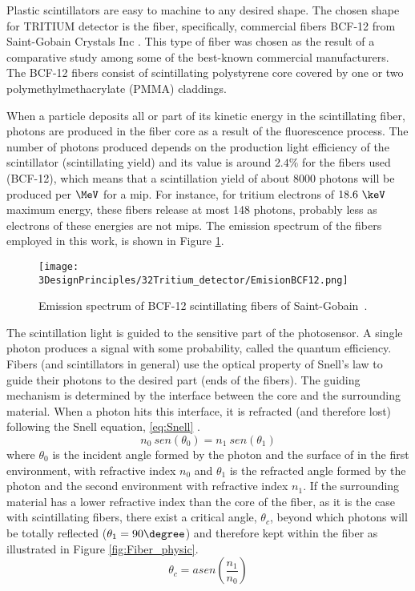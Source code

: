 Plastic scintillators are easy to machine to any desired shape. The chosen shape for TRITIUM detector is the fiber, specifically, commercial fibers BCF-12 from Saint-Gobain Crystals Inc \cite{DataSheetBCF12Fiber}. This type of fiber was chosen as the result of a comparative study \cite{TFGAlberto} among some of the best-known commercial manufacturers. The BCF-12 fibers consist of scintillating polystyrene core covered by one or two polymethylmethacrylate (PMMA) claddings. %

When a particle deposits all or part of its kinetic energy in the scintillating fiber, photons are produced in the fiber core as a result of the fluorescence process. The number of photons produced depends on the production light efficiency of the scintillator (scintillating yield) and its value is around $2.4\%$ for the fibers used (BCF-12), which means that a scintillation yield of about $8000$ photons will be produced per $\MeV$ for a mip. For instance, for tritium electrons of $18.6~\keV$ maximum energy, these fibers release at most 148 photons, probably less as electrons of these energies are not mips. The emission spectrum of the fibers employed in this work, is shown in Figure \ref{fig:EmissionSpectrumFibers}.

\begin{figure}[htbp]
\centering
\texttt{[image: 3DesignPrinciples/32Tritium\_detector/EmisionBCF12.png]}
\caption{Emission spectrum of BCF-12 scintillating fibers of Saint-Gobain\label{fig:EmissionSpectrumFibers}~\cite{DataSheetBCF12Fiber}.}
\end{figure}

The scintillation light is guided to the sensitive part of the photosensor. A single photon produces a signal with some probability, called the quantum efficiency. Fibers (and scintillators in general) use the optical property of Snell's law \cite{Snell} to guide their photons to the desired part (ends of the fibers). The guiding mechanism is determined by the interface between the core and the surrounding material. When a photon hits this interface, it is refracted (and therefore lost) following the Snell equation, \ref{eq:Snell} \cite{Snell}. 
\begin{equation}
n_0~sen(\theta_0) = n_1~sen(\theta_1)
\label{eq:Snell}
\end{equation}
where $\theta_0$ is the incident angle formed by the photon and the surface of in the first environment, with refractive index $n_0$ and $\theta_1$  is the refracted angle formed by the photon and the second environment with refractive index $n_1$. If the surrounding material has a lower refractive index than the core of the fiber, as it is the case with scintillating fibers, there exist a critical angle, $\theta_c$, beyond which photons will be totally reflected ($\theta_1 = 90\degree$) and therefore kept within the fiber as illustrated in Figure \ref{fig:Fiber_physic}.
\begin{equation}
\theta_c = asen\left(\frac{n_1}{n_0} \right)
\label{eq:CriticAngle}
\end{equation}


